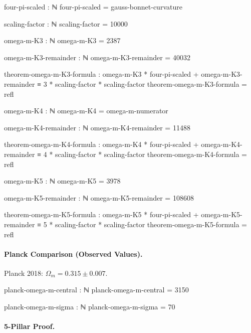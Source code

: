 \documentclass[11pt,a4paper]{book}
\begin{document}
\begin{code}
four-pi-scaled : ℕ
four-pi-scaled = gauss-bonnet-curvature

scaling-factor : ℕ
scaling-factor = 10000

omega-m-K3 : ℕ
omega-m-K3 = 2387

omega-m-K3-remainder : ℕ
omega-m-K3-remainder = 40032

theorem-omega-m-K3-formula : omega-m-K3 * four-pi-scaled + omega-m-K3-remainder ≡ 3 * scaling-factor * scaling-factor
theorem-omega-m-K3-formula = refl

omega-m-K4 : ℕ
omega-m-K4 = omega-m-numerator

omega-m-K4-remainder : ℕ
omega-m-K4-remainder = 11488

theorem-omega-m-K4-formula : omega-m-K4 * four-pi-scaled + omega-m-K4-remainder ≡ 4 * scaling-factor * scaling-factor
theorem-omega-m-K4-formula = refl

omega-m-K5 : ℕ
omega-m-K5 = 3978

omega-m-K5-remainder : ℕ
omega-m-K5-remainder = 108608

theorem-omega-m-K5-formula : omega-m-K5 * four-pi-scaled + omega-m-K5-remainder ≡ 5 * scaling-factor * scaling-factor
theorem-omega-m-K5-formula = refl

\end{code}

\paragraph{Planck Comparison (Observed Values).}
Planck 2018: $\Omega_m = 0.315 \pm 0.007$.

\begin{code}
planck-omega-m-central : ℕ
planck-omega-m-central = 3150

planck-omega-m-sigma : ℕ
planck-omega-m-sigma = 70

\end{code}

\paragraph{5-Pillar Proof.}
\end{document}
